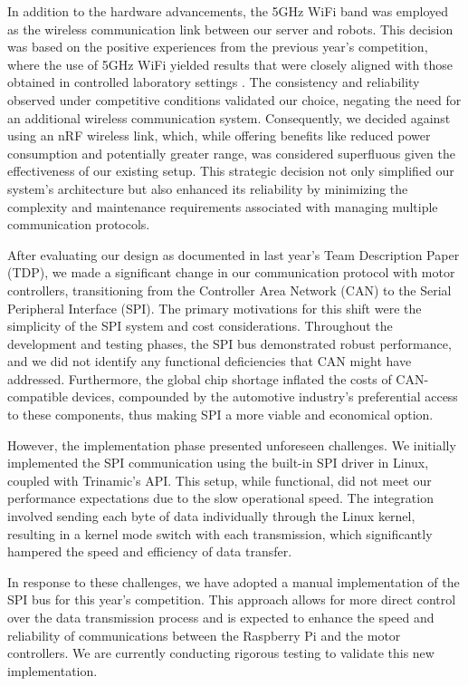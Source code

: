 \documentclass[runningheads]{llncs}
\begin{document}
In addition to the hardware advancements, the 5GHz WiFi band was employed as the wireless communication link between our server and robots. This decision was based on the positive experiences from the previous year's competition, where the use of 5GHz WiFi yielded results that were closely aligned with those obtained in controlled laboratory settings \cite{ref_ETDP2023}. The consistency and reliability observed under competitive conditions validated our choice, negating the need for an additional wireless communication system. Consequently, we decided against using an nRF wireless link, which, while offering benefits like reduced power consumption and potentially greater range, was considered superfluous given the effectiveness of our existing setup. This strategic decision not only simplified our system's architecture but also enhanced its reliability by minimizing the complexity and maintenance requirements associated with managing multiple communication protocols.

After evaluating our design as documented in last year's Team Description Paper (TDP), we made a significant change in our communication protocol with motor controllers, transitioning from the Controller Area Network (CAN) to the Serial Peripheral Interface (SPI). The primary motivations for this shift were the simplicity of the SPI system and cost considerations. Throughout the development and testing phases, the SPI bus demonstrated robust performance, and we did not identify any functional deficiencies that CAN might have addressed. Furthermore, the global chip shortage inflated the costs of CAN-compatible devices, compounded by the automotive industry's preferential access to these components, thus making SPI a more viable and economical option.

However, the implementation phase presented unforeseen challenges. We initially implemented the SPI communication using the built-in SPI driver in Linux, coupled with Trinamic's API. This setup, while functional, did not meet our performance expectations due to the slow operational speed. The integration involved sending each byte of data individually through the Linux kernel, resulting in a kernel mode switch with each transmission, which significantly hampered the speed and efficiency of data transfer.

In response to these challenges, we have adopted a manual implementation of the SPI bus for this year's competition. This approach allows for more direct control over the data transmission process and is expected to enhance the speed and reliability of communications between the Raspberry Pi and the motor controllers. We are currently conducting rigorous testing to validate this new implementation.
\end{document}
